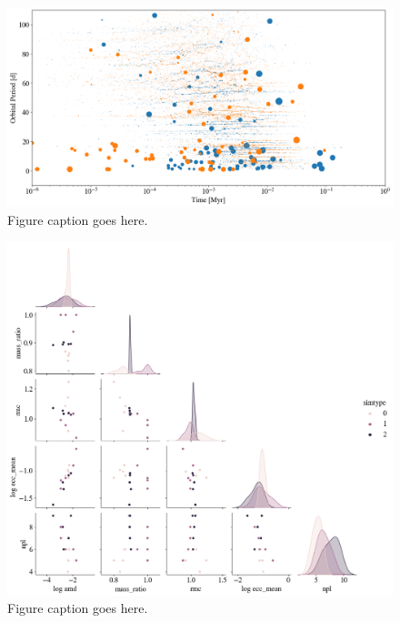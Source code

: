 \begin{figure}
\begin{center}
    \includegraphics[width=\textwidth]{figures/stip/full_coll_syn_comp.png}
    \caption{Figure caption goes here.\label{fig:full_coll_syn_comp}}
\end{center}
\end{figure}

\begin{figure}
\begin{center}
    \includegraphics[width=\textwidth]{figures/stip/corner_full_syn_iso.png}
    \caption{Figure caption goes here.\label{fig:corner_full_syn_iso}}
\end{center}
\end{figure}

